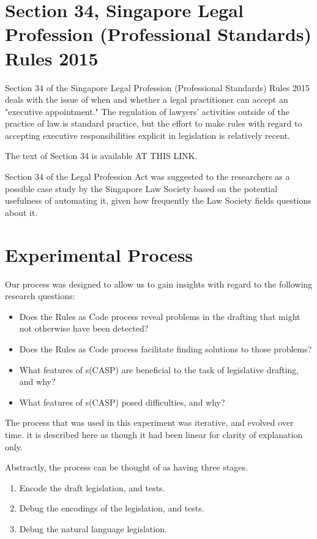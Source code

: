 \documentclass[sigconf]{acmart}
\begin{document}
\section{Section 34, Singapore Legal Profession (Professional Standards) Rules 2015}

Section 34 of the Singapore Legal Profession (Professional Standards) Rules 2015 
deals with the issue of when and whether a legal practitioner
can accept an "executive appointment."
The regulation of lawyers' activities outside of the practice of law is
standard practice, but the effort to make rules with regard to
accepting executive responsibilities explicit in legislation is relatively recent.

The text of Section 34 is available AT THIS LINK.

Section 34 of the Legal Profession Act was suggested to the researchers as a 
possible
case study by the Singapore Law Society based on the potential usefulness of 
automating it, given how frequently the Law Society fields questions about it.

\section{Experimental Process}

Our process was designed to allow us to gain insights with regard to the following research questions:

\begin{itemize}
    \item Does the Rules as Code process reveal problems in the drafting that might not otherwise have been detected?
    \item Does the Rules as Code process facilitate finding solutions to those problems?
    \item What features of s(CASP) are beneficial to the task of legislative drafting, and why?
    \item What features of s(CASP) posed difficulties, and why?
\end{itemize}

The process that was used in this experiment was iterative, and evolved over time.  
it is described here as though it had been linear for clarity of explanation only.

Abstractly, the process can be thought of as having three stages.

\begin{enumerate}
    \item{Encode the draft legislation, and tests.}
    \item{Debug the encodings of the legislation, and tests.}
    \item{Debug the natural language legislation.}
\end{enumerate}
\end{document}
